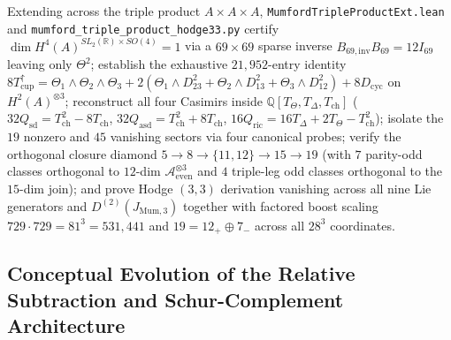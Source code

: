\documentclass[11pt,a4paper]{article}
\begin{document}
Extending across the triple product $A \times A \times A$, {\small\texttt{Mumford\allowbreak{}Triple\allowbreak{}Product\allowbreak{}Ext.lean}} and {\small\texttt{mumford\_\allowbreak{}triple\_\allowbreak{}product\_\allowbreak{}hodge33.py}} certify $\dim H^4(A)^{SL_2(\mathbb{R})\times SO(4)} = 1$ via a $69\times 69$ sparse inverse $B_{69,\mathrm{inv}} B_{69} = 12 I_{69}$ leaving only $\Theta^2$; establish the exhaustive $21{,}952$-entry identity $8 T_{\mathrm{cup}}^\uparrow = \Theta_1\wedge\Theta_2\wedge\Theta_3 + 2(\Theta_1\wedge D_{23}^2 + \Theta_2\wedge D_{13}^2 + \Theta_3\wedge D_{12}^2) + 8 D_{\mathrm{cyc}}$ on $H^2(A)^{\otimes 3}$; reconstruct all four Casimirs inside $\mathbb{Q}[T_\Theta, T_\Delta, T_{\mathrm{ch}}]$ ($32 Q_{\mathrm{sd}} = T_{\mathrm{ch}}^2 - 8 T_{\mathrm{ch}}$, $32 Q_{\mathrm{asd}} = T_{\mathrm{ch}}^2 + 8 T_{\mathrm{ch}}$, $16 Q_{\mathrm{ric}} = 16 T_\Delta + 2 T_\Theta - T_{\mathrm{ch}}^2$); isolate the $19$ nonzero and $45$ vanishing sectors via four canonical probes; verify the orthogonal closure diamond $5 \to 8 \to \{11, 12\} \to 15 \to 19$ (with $7$ parity-odd classes orthogonal to $12$-dim $\mathcal{A}_{\mathrm{even}}^{\otimes 3}$ and $4$ triple-leg odd classes orthogonal to the $15$-dim join); and prove Hodge $(3,3)$ derivation vanishing across all nine Lie generators and $D^{(2)}(J_{\mathrm{Mum},3})$ together with factored boost scaling $729 \cdot 729 = 81^3 = 531{,}441$ and $19 = 12_+ \oplus 7_-$ across all $28^3$ coordinates.

\subsection{Conceptual Evolution of the Relative Subtraction and Schur-Complement Architecture}
\end{document}
